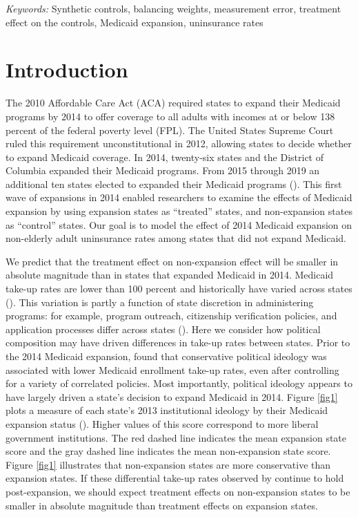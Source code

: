\documentclass[12pt]{article}
\def\spacingset#1{\renewcommand{\baselinestretch}%
{#1}\small\normalsize} \spacingset{1}
\begin{document}
\noindent%
{\it Keywords:} Synthetic controls, balancing weights, measurement error, treatment effect on the controls, Medicaid expansion, uninsurance rates
\vfill

\newpage
\spacingset{1.45} %

\maketitle

\section{Introduction}

The 2010 Affordable Care Act (ACA) required states to expand their Medicaid programs by 2014 to offer coverage to all adults with incomes at or below 138 percent of the federal poverty level (FPL). The United States Supreme Court ruled this requirement unconstitutional in 2012, allowing states to decide whether to expand Medicaid coverage. In 2014, twenty-six states and the District of Columbia expanded their Medicaid programs. From 2015 through 2019 an additional ten states elected to expanded their Medicaid programs (\cite{KFF}). This first wave of expansions in 2014 enabled researchers to examine the effects of Medicaid expansion by using expansion states as ``treated'' states, and non-expansion states as ``control'' states. Our goal is to model the effect of 2014 Medicaid expansion on non-elderly adult uninsurance rates among states that did not expand Medicaid.

We predict that the treatment effect on non-expansion effect will be smaller in absolute magnitude than in states that expanded Medicaid in 2014. Medicaid take-up rates are lower than 100 percent and historically have varied across states (\cite{sommers2012understanding}). This variation is partly a function of state discretion in administering programs: for example, program outreach, citizenship verification policies, and application processes differ across states (\cite{courtemanche2017early}). Here we consider how political composition may have driven differences in take-up rates between states. Prior to the 2014 Medicaid expansion, \cite{sommers2012understanding} found that conservative political ideology was associated with lower Medicaid enrollment take-up rates, even after controlling for a variety of correlated policies. Most importantly, political ideology appears to have largely driven a state's decision to expand Medicaid in 2014. Figure \ref{fig1} plots a measure of each state's 2013 institutional ideology by their Medicaid expansion status (\cite{fording}). Higher values of this score correspond to more liberal government institutions. The red dashed line indicates the mean expansion state score and the gray dashed line indicates the mean non-expansion state score. Figure \ref{fig1} illustrates that non-expansion states are more conservative than expansion states.  If these differential take-up rates observed by \cite{sommers2012understanding} continue to hold post-expansion, we should expect treatment effects on non-expansion states to be smaller in absolute magnitude than treatment effects on expansion states. 
\end{document}
